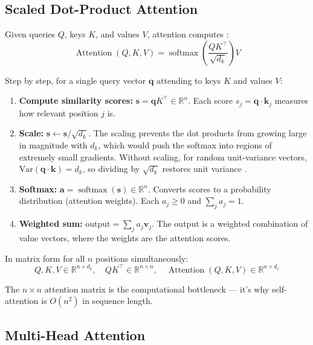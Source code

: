 \documentclass[11pt,a4paper]{article}
\newcommand{\R}{\mathbb{R}}
\newcommand{\softmax}{\operatorname{softmax}}
\newcommand{\Attention}{\operatorname{Attention}}
\newcommand{\dk}{d_k}
\newcommand{\dv}{d_v}
\begin{document}
\subsection{Scaled Dot-Product Attention}

Given queries $Q$, keys $K$, and values $V$, attention computes \cite{vaswani2017}:
\begin{equation}
\label{eq:attention}
  \Attention(Q, K, V) = \softmax\!\left(\frac{QK^\top}{\sqrt{\dk}}\right) V
\end{equation}

Step by step, for a single query vector $\bm{q}$ attending to keys $K$ and values $V$:

\begin{enumerate}[nosep]
  \item \textbf{Compute similarity scores:} $\bm{s} = \bm{q} K^\top \in \R^n$. Each
    score $s_j = \bm{q} \cdot \bm{k}_j$ measures how relevant position $j$ is.
  \item \textbf{Scale:} $\bm{s} \leftarrow \bm{s} / \sqrt{\dk}$. The scaling prevents
    the dot products from growing large in magnitude with $\dk$, which would push the
    softmax into regions of extremely small gradients. Without scaling, for random unit-variance
    vectors, $\text{Var}(\bm{q} \cdot \bm{k}) = \dk$, so dividing by $\sqrt{\dk}$
    restores unit variance \cite{vaswani2017}.
  \item \textbf{Softmax:} $\bm{a} = \softmax(\bm{s}) \in \R^n$. Converts scores to a
    probability distribution (attention weights). Each $a_j \geq 0$ and $\sum_j a_j = 1$.
  \item \textbf{Weighted sum:} $\text{output} = \sum_j a_j \bm{v}_j$. The output is a
    weighted combination of value vectors, where the weights are the attention scores.
\end{enumerate}

In matrix form for all $n$ positions simultaneously:
\begin{equation}
  Q, K, V \in \R^{n \times \dk}, \quad
  QK^\top \in \R^{n \times n}, \quad
  \Attention(Q, K, V) \in \R^{n \times \dv}
\end{equation}

The $n \times n$ attention matrix is the computational bottleneck --- it's why
self-attention is $O(n^2)$ in sequence length.

\subsection{Multi-Head Attention}
\end{document}
